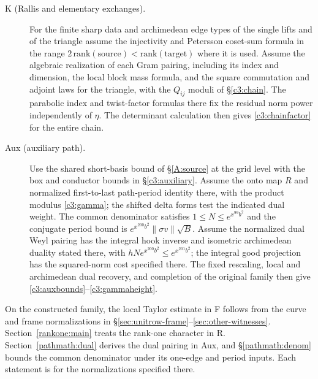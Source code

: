 \begin{description}
\item[K (Rallis and elementary exchanges).]
For the finite sharp data and archimedean edge types of the
single lifts and of the triangle assume the injectivity and
Petersson coset-sum formula in the range
$2\,\mathrm{rank}(\text{source})<\mathrm{rank}(\text{target})$
where it is used. Assume the algebraic realization of each
Gram pairing, including its index and dimension, the local block
mass formula, and the square commutation and adjoint laws for the
triangle, with the $Q_{ij}$ moduli of \S\ref{c3:chain}. The
parabolic index and twist-factor formulas there fix the residual
norm power independently of $\eta$. The determinant calculation
then gives \eqref{c3:chainfactor} for the entire chain.

\item[Aux (auxiliary path).]
Use the shared short-basis bound of \S\ref{A:source} at the grid
level with the box and conductor bounds in \S\ref{c3:auxiliary}.
Assume the onto map $R$ and normalized first-to-last path-period
identity there, with the product modulus \eqref{c3:gamma};
the shifted delta forms test the indicated dual weight.
The common denominator satisfies $1\le N\le e^{x^{99}b^2}$ and
the conjugate period bound is $e^{x^{200}b^2}\|\sigma v\|\sqrt B$.
Assume the normalized dual Weyl pairing has the integral hook
inverse and isometric archimedean duality stated there, with
$hN e^{x^{200}b^2}\le e^{x^{201}b^2}$; the integral good
projection has the squared-norm cost specified there. The
fixed rescaling, local and archimedean dual recovery, and
completion of the original family then give
\eqref{c3:auxbounds}--\eqref{c3:gammaheight}.
\end{description}

On the constructed family, the local Taylor estimate in F follows from the
curve and frame normalizations in \S\ref{sec:unitrow-frame}--\ref{sec:other-witnesses}.
Section~\ref{rankone:main} treats the rank-one character in R.
Section~\ref{pathmath:dual} derives the dual pairing in Aux, and
\S\ref{pathmath:denom} bounds the common denominator under its one-edge and
period inputs. Each statement is for the normalizations specified there.
